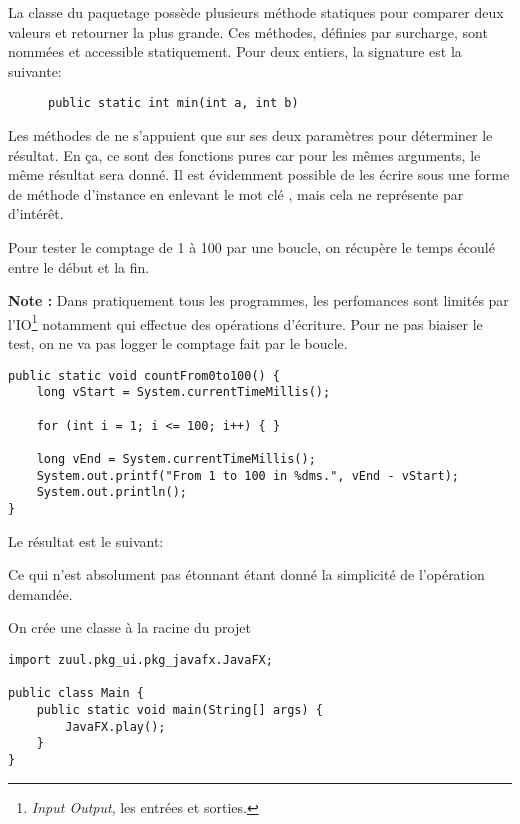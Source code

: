 \begin{exercise}[subtitle=maximum]

La classe  du paquetage  possède plusieurs méthode statiques pour comparer deux valeurs et retourner la plus grande. Ces méthodes, définies par surcharge, sont nommées  et accessible statiquement. Pour deux entiers, la signature est la suivante:

\begin{figure}[h]
  \centering
  \texttt{public static int min(int a, int b)}
\end{figure}

\end{exercise}

\begin{exercise}[subtitle=static]

Les méthodes  de  ne s'appuient que sur ses deux paramètres pour déterminer le résultat. En ça, ce sont des fonctions pures car pour les mêmes arguments, le même résultat sera donné. Il est évidemment possible de les écrire sous une forme de méthode d'instance en enlevant le mot clé , mais cela ne représente par d'intérêt.

\end{exercise}

\begin{exercise}[subtitle=currentTimeMillis]

Pour tester le comptage de 1 à 100 par une boucle, on récupère le temps écoulé entre le début et la fin.

\textbf{Note :} Dans pratiquement tous les programmes, les perfomances sont limités par l'IO\footnote{\textit{Input Output}, les entrées et sorties.} notamment  qui effectue des opérations d'écriture. Pour ne pas biaiser le test, on ne va pas logger le comptage fait par le boucle.

\begin{verbatim}
public static void countFrom0to100() {
    long vStart = System.currentTimeMillis();

    for (int i = 1; i <= 100; i++) { }

    long vEnd = System.currentTimeMillis();
    System.out.printf("From 1 to 100 in %dms.", vEnd - vStart);
    System.out.println();
}
\end{verbatim}

Le résultat est le suivant:


Ce qui n'est absolument pas étonnant étant donné la simplicité de l'opération demandée.
\end{exercise}

\begin{exercise}[subtitle=Main]

On crée une classe  à la racine du projet

\begin{verbatim}
import zuul.pkg_ui.pkg_javafx.JavaFX;

public class Main {
    public static void main(String[] args) {
        JavaFX.play();
    }
}
\end{verbatim}
\end{exercise}
